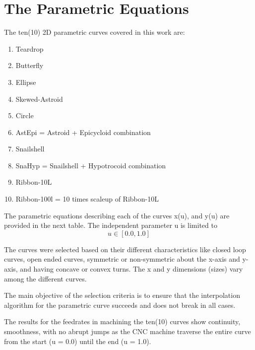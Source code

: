 
	
\section{The Parametric Equations}


The ten(10) 2D parametric curves covered in this work are:
\begin{enumerate}
	\item Teardrop
	\item Butterfly
	\item Ellipse
	\item Skewed-Astroid
	\item Circle
	\item AstEpi = Astroid + Epicycloid combination
	\item Snailshell
	\item SnaHyp = Snailshell + Hypotrocoid combination
	\item Ribbon-10L
	\item Ribbon-100l = 10 times scaleup of Ribbon-10L
	
\end{enumerate}

The parametric equations describing each of the curves x(u), and y(u) are provided in the next table. The independent parameter u is limited to
\begin{equation}
u  \in  [0.0, 1.0] \nonumber
\end{equation}

The curves were selected based on their different characteristics like closed loop curves, open ended curves, symmetric or non-symmetric about the x-axis and y-axis, and having concave or convex turns. The x and y dimensions (sizes) vary among the different curves. \vspace*{1\baselineskip}

The main objective of the selection criteria is to ensure that the interpolation algorithm for the parametric curve succeeds and does not break in all cases. \vspace*{1\baselineskip}
	
The results for the feedrates in machining the ten(10) curves show continuity, smoothness, with no abrupt jumps as the CNC machine traverse the entire curve from the start (u = 0.0) until the end (u = 1.0).	\vspace*{1\baselineskip}




